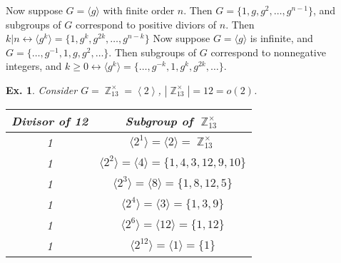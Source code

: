 \documentclass[12pt, a4paper]{book}
\DeclareMathOperator{\Z}{\mathbb{Z}}
\newtheorem{example}[theorem]{Ex.}
\theoremstyle{nonumberplain}
\begin{document}
Now suppose $G=\langle g\rangle$ with finite order $n$.
Then $G=\{1,g,g^2,\ldots,g^{n-1}\}$, and subgroups of $G$ correspond to positive diviors of $n$.
Then $k|n\leftrightarrow\langle g^k\rangle=\{1,g^k,g^{2k},\ldots,g^{n-k}\}$
Now suppose $G=\langle g\rangle$ is infinite, and $G=\{\ldots,g^{-1},1,g,g^2,\ldots\}$.
Then subgroups of $G$ correspond to nonnegative integers, and $k\geq 0\leftrightarrow \langle g^k\rangle=\{\ldots,g^{-k},1,g^k,g^{2k},\ldots\}$.
\begin{example}
    Consider $G=\Z_{13}^\times=\left\langle 2\right\rangle$, $|\Z_{13}^\times|=12=o(2)$.
    \begin{center}
        \begin{tabular}{c|c}
            Divisor of 12&Subgroup of $\Z_{13}^\times$\\
            \hline
            1& $\langle 2^1\rangle=\langle 2\rangle=\Z_{13}^\times$\\
            1& $\langle 2^2\rangle=\langle 4\rangle=\{1,4,3,12,9,10\}$\\
            1& $\langle 2^3\rangle=\langle 8\rangle=\{1,8,12,5\}$\\
            1& $\langle 2^4\rangle=\langle 3\rangle=\{1,3,9\}$\\
            1& $\langle 2^6\rangle=\langle 12\rangle=\{1,12\}$\\
            1& $\langle 2^{12}\rangle=\langle 1\rangle =\{1\}$
        \end{tabular}
    \end{center}
\end{example}
\end{document}
